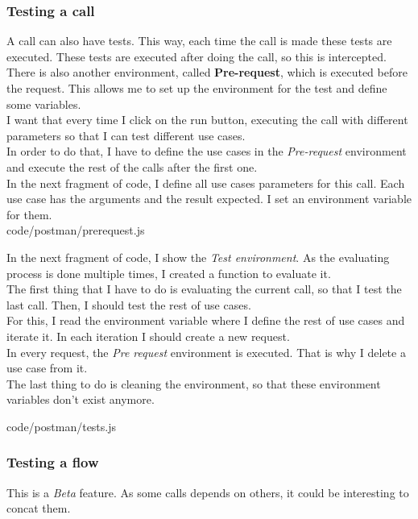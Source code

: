 \subsubsection{Testing a call}
A call can also have tests. This way, each time the call is made these tests are executed. These tests are executed after doing the call, so this is intercepted. \\
There is also another environment, called \textbf{Pre-request}, which is executed before the request. This allows me to set up the environment for the test and define some variables. \\

I want that every time I click on the run button, executing the call with different parameters so that I can test different use cases. \\
In order to do that, I have to define the use cases in the \textit{Pre-request} environment and execute the rest of the calls after the first one. \\

In the next fragment of code, I define all use cases parameters for this call. Each use case has the arguments and the result expected. I set an environment variable for them.\\

{code/postman/prerequest.js}

In the next fragment of code, I show the \textit{Test environment}. As the evaluating process is done multiple times, I created a function to evaluate it. \\
The first thing that I have to do is evaluating the current call, so that I test the last call. Then, I should test the rest of use cases. \\
For this, I read the environment variable where I define the rest of use cases and iterate it. In each iteration I should create a new request. \\
In every request, the \textit{Pre request} environment is executed. That is why I delete a use case from it. \\
The last thing to do is cleaning the environment, so that these environment variables don't exist anymore.

{code/postman/tests.js}

\subsubsection{Testing a flow}
This is a \textit{Beta} feature. As some calls depends on others, it could be interesting to concat them. \\

